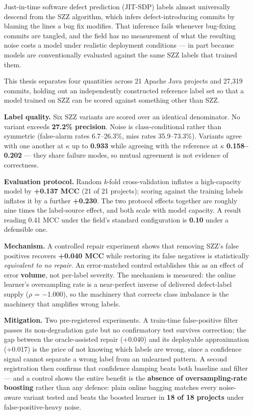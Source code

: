 Just-in-time software defect prediction (JIT-SDP) labels almost
universally descend from the SZZ algorithm, which infers
defect-introducing commits by blaming the lines a bug fix modifies. That
inference fails whenever bug-fixing commits are tangled, and the field
has no measurement of what the resulting noise costs a model under
realistic deployment conditions --- in part because models are
conventionally evaluated against the same SZZ labels that trained them.

This thesis separates four quantities across 21 Apache Java projects and
27,319 commits, holding out an independently constructed reference label
set so that a model trained on SZZ can be scored against something other
than SZZ.

\textbf{Label quality.} Six SZZ variants are scored over an identical
denominator. No variant exceeds \textbf{27.2\% precision}. Noise is
class-conditional rather than symmetric (false-alarm rates 6.7--26.3\%,
miss rates 35.9--73.3\%). Variants agree with one another at \ensuremath{\kappa} up to
\textbf{0.933} while agreeing with the reference at \ensuremath{\kappa}
\textbf{0.158--0.202} --- they share failure modes, so mutual agreement
is not evidence of correctness.

\textbf{Evaluation protocol.} Random \emph{k}-fold cross-validation
inflates a high-capacity model by \textbf{+0.137 MCC} (21 of 21
projects); scoring against the training labels inflates it by a further
\textbf{+0.230}. The two protocol effects together are roughly nine
times the label-source effect, and both scale with model capacity. A
result reading 0.41 MCC under the field's standard configuration is
\textbf{0.10} under a defensible one.

\textbf{Mechanism.} A controlled repair experiment shows that removing
SZZ's false positives recovers \textbf{+0.040 MCC} while restoring its
false negatives is statistically \emph{equivalent to no repair}. An
error-matched control establishes this as an effect of error
\textbf{volume}, not per-label severity. The mechanism is measured: the
online learner's oversampling rate is a near-perfect inverse of
delivered defect-label supply (\ensuremath{\rho} = \ensuremath{-}1.000), so the machinery that
corrects class imbalance is the machinery that amplifies wrong labels.

\textbf{Mitigation.} Two pre-registered experiments. A train-time
false-positive filter passes its non-degradation gate but no
confirmatory test survives correction; the gap between the
oracle-assisted repair (+0.040) and its deployable approximation
(+0.017) is the price of not knowing which labels are wrong, since a
confidence signal cannot separate a wrong label from an unlearned
pattern. A second registration then confirms that confidence damping
beats both baseline and filter --- and a control shows the entire
benefit is the \textbf{absence of oversampling-rate boosting} rather
than any defence: plain online bagging matches every noise-aware variant
tested and beats the boosted learner in \textbf{18 of 18 projects} under
false-positive-heavy noise.

